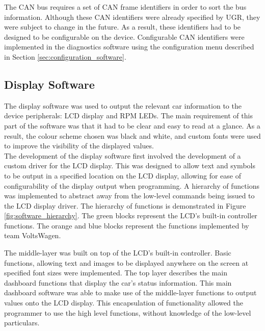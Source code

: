 \documentclass[a4paper,12pt]{article}
\begin{document}
The CAN bus requires a set of CAN frame identifiers in order to sort the bus information. Although these CAN identifiers were already specified by UGR, they were subject to change in the future. As a result, these identifiers had to be designed to be configurable on the device. Configurable CAN identifiers were implemented in the diagnostics software using the configuration menu described in Section \ref{sec:configuration_software}.

\subsection{Display Software}
\label{sec:display_software}

The display software was used to output the relevant car information to the device peripherals: LCD display and RPM LEDs. The main requirement of this part of the software was that it had to be clear and easy to read at a glance. As a result, the colour scheme chosen was black and white, and custom fonts were used to improve the visibility of the displayed values. \\

The development of the display software first involved the development of a custom driver for the LCD display. This was designed to allow text and symbols to be output in a specified location on the LCD display, allowing for ease of configurability of the display output when programming. A hierarchy of functions was implemented to abstract away from the low-level commands being issued to the LCD display driver. The hierarchy of functions is demonstrated in Figure \ref{fig:software_hierarchy}. The green blocks represent the LCD's built-in controller functions. The orange and blue blocks represent the functions implemented by team VoltsWagen.



The middle-layer was built on top of the LCD's built-in controller. Basic functions, allowing text and images to be displayed anywhere on the screen at specified font sizes were implemented. The top layer describes the main dashboard functions that display the car's status information. This main dashboard software was able to make use of the middle-layer functions to output values onto the LCD display. This encapsulation of functionality allowed the programmer to use the high level functions, without knowledge of the low-level particulars.


\end{document}
